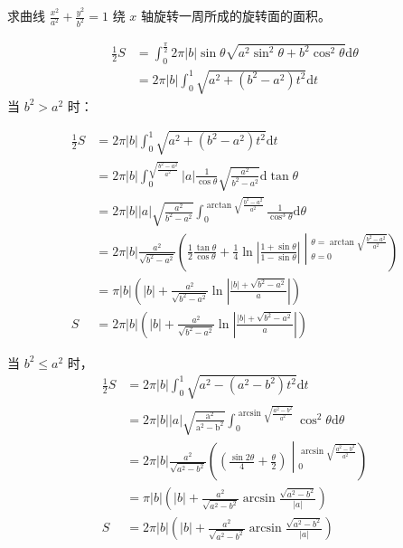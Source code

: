 \begin{ques}
	求曲线 $\displaystyle \frac{x^{2}}{a^{2}} +\frac{y^{2}}{b^{2}} =1$ 绕 $\displaystyle x$ 轴旋转一周所成的旋转面的面积。
\end{ques}




\begin{align*}
	\frac{1}{2} S & =\int _{0}^{\frac{\pi }{2}} 2\pi |b|\sin \theta \sqrt{a^{2}\sin^{2} \theta +b^{2}\cos^{2} \theta }\mathrm{d} \theta \\
	& =2\pi |b|\int _{0}^{1}\sqrt{a^{2} +\left( b^{2} -a^{2}\right) t^{2}}\mathrm{d} t
\end{align*}
当 $\displaystyle b^{2}  >a^{2}$ 时：


\begin{align*}
	\frac{1}{2} S & =2\pi |b|\int _{0}^{1}\sqrt{a^{2} +\left( b^{2} -a^{2}\right) t^{2}}\mathrm{d} t\\
	& =2\pi |b|\int _{0}^{\sqrt{\frac{b^{2} -a^{2}}{a^{2}}}} |a|\frac{1}{\cos \theta }\sqrt{\frac{a^{2}}{b^{2} -a^{2}}}\mathrm{d}\tan \theta \\
	& =2\pi |b||a|\sqrt{\frac{a^{2}}{b^{2} -a^{2}}}\int _{0}^{\arctan\sqrt{\frac{b^{2} -a^{2}}{a^{2}}}}\frac{1}{\cos^{3} \theta }\mathrm{d} \theta \\
	& =2\pi |b|\frac{a^{2}}{\sqrt{b^{2} -a^{2}}}\left(\frac{1}{2}\frac{\tan \theta }{\cos \theta } +\frac{1}{4}\ln\left| \frac{1+\sin \theta }{1-\sin \theta }\right| \middle| _{\theta =0}^{\theta =\arctan\sqrt{\frac{b^{2} -a^{2}}{a^{2}}}}\right)\\
	& =\pi |b|\left( |b|+\frac{a^{2}}{\sqrt{b^{2} -a^{2}}}\ln\left| \frac{|b|+\sqrt{b^{2} -a^{2}}}{a}\right| \right)\\
	S & =2\pi |b|\left( |b|+\frac{a^{2}}{\sqrt{b^{2} -a^{2}}}\ln\left| \frac{|b|+\sqrt{b^{2} -a^{2}}}{a}\right| \right)
\end{align*}


当 $\displaystyle b^{2} \leqslant a^{2}$ 时，
\begin{align*}
	\frac{1}{2} S & =2\pi |b|\int _{0}^{1}\sqrt{a^{2} -\left( a^{2} -b^{2}\right) t^{2}}\mathrm{d} t\\
	& =2\pi |b||a|\mathrm{\sqrt{\frac{a^{2}}{a^{2} -b^{2}}}}\int _{0}^{\arcsin\sqrt{\frac{a^{2} -b^{2}}{a^{2}}}}\cos^{2} \theta \mathrm{d} \theta \\
	& =2\pi |b|\frac{a^{2}}{\sqrt{a^{2} -b^{2}}}\left(\left(\frac{\sin 2\theta }{4} +\frac{\theta }{2}\right)\middle| _{0}^{\arcsin\sqrt{\frac{a^{2} -b^{2}}{a^{2}}}}\right)\\
	& =\pi |b|\left( |b|+\frac{a^{2}}{\sqrt{a^{2} -b^{2}}}\arcsin\frac{\sqrt{a^{2} -b^{2}}}{|a|}\right)\\
	S & =2\pi |b|\left( |b|+\frac{a^{2}}{\sqrt{a^{2} -b^{2}}}\arcsin\frac{\sqrt{a^{2} -b^{2}}}{|a|}\right)
\end{align*}


